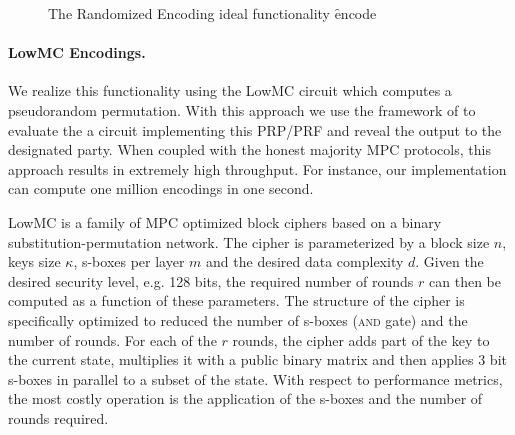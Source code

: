 \begin{figure}[ht]
	\caption{The Randomized Encoding ideal functionality \f{encode}}
	\label{fig:randomized-encode-ideal}	
\end{figure}


\paragraph{LowMC Encodings.}
We realize this functionality using the LowMC circuit\cite{lowmc} which computes a pseudorandom permutation. With this approach we use the framework of \cite{aby3, highthroughput} to evaluate the a circuit implementing this PRP/PRF and reveal the output to the designated party. When coupled with the honest majority MPC protocols\cite{aby3, highthroughput}, this approach results in extremely high throughput. For instance, our implementation can compute one million encodings in one second.

LowMC is a family of MPC optimized block ciphers based on a binary substitution-permutation network. The cipher is parameterized by a block size $n$, keys size $\kappa$, s-boxes per layer $m$ and the desired data complexity $d$. Given the desired security level, e.g. 128 bits, the required number of rounds $r$ can then be computed as a function of these parameters. The structure of the cipher is specifically optimized to reduced the number of s-boxes (\textsc{and} gate) and the number of rounds. For each of the $r$ rounds, the cipher adds part of the key to the current state, multiplies it with a public binary matrix and then applies 3 bit s-boxes in parallel to a subset of the state. With respect to performance metrics, the most costly operation is the application of the s-boxes and the number of rounds required. 

